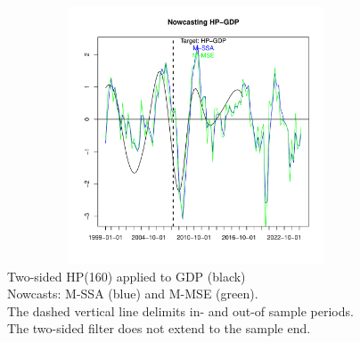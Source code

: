 \documentclass[11pt,a4paper]{article}
\begin{document}
\begin{figure}[htpb]
    \begin{center}
        \includegraphics[height=3in, width=4.5in]{./Figures/mssa_msse_now.pdf}
        \caption{Two-sided HP(160) applied to GDP (black)\\ Nowcasts: M-SSA (blue) and M-MSE (green). \\The dashed vertical line delimits in- and out-of sample periods.  \\The two-sided filter does not extend to the sample end.
        \label{mssa_msse_now}}
    \end{center}
\end{figure}
\end{document}
